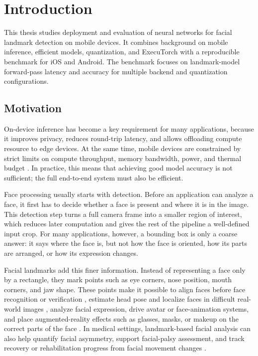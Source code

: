 
\chapter{Introduction}
\setcounter{page}{1}

\begin{chapterabstract}
This thesis studies deployment and evaluation of neural networks for facial
landmark detection on mobile devices. It combines background on mobile inference,
efficient models, quantization, and ExecuTorch with a reproducible benchmark for
iOS and Android. The benchmark focuses on landmark-model forward-pass latency
and accuracy for multiple backend and quantization configurations.
\end{chapterabstract}

\section{Motivation}

On-device inference has become a key requirement for many applications, because 
it improves privacy, reduces round-trip latency, and
allows offloading compute resource to edge devices. At the same time, mobile devices are constrained by
strict limits on compute throughput, memory bandwidth, power, and thermal
budget \cite{wang2020mobilesoc,li2024mobilebenchmark}. In practice, this
means that achieving good model accuracy is not sufficient; the full
end-to-end system must also be efficient.

Face processing usually starts with detection. Before an application can analyze
a face, it first has to decide whether a face is present and where it is in the
image. This detection step turns a full camera frame into a smaller region of
interest, which reduces later computation and gives the rest of the pipeline a
well-defined input crop. For many applications, however, a bounding box is only a
coarse answer: it says where the face is, but not how the face is oriented, how
its parts are arranged, or how its expression changes.

Facial landmarks add this finer information. Instead of representing a
face only by a rectangle, they mark points such as eye corners, nose position,
mouth corners, and jaw shape. These points make it possible to align faces before
face recognition or verification \cite{chen2018mobilefacenets}, estimate head
pose and localize faces in difficult real-world images
\cite{zhu2012facedetectionwild}, analyze facial expression, drive avatar or
face-animation systems, and place augmented-reality effects such as glasses,
masks, or makeup on the correct parts of the face \cite{guo2019pfld}. In medical
settings, landmark-based facial analysis can also help quantify facial asymmetry,
support facial-palsy assessment, and track recovery or rehabilitation progress
from facial movement changes \cite{vrochidou2023facialpalsy}.

